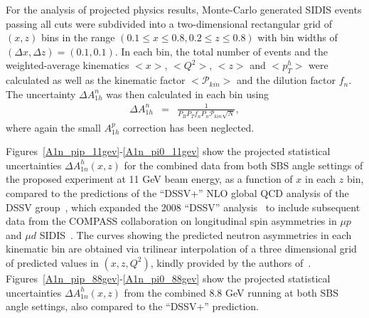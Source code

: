 For the analysis of projected physics results, Monte-Carlo generated SIDIS events passing all cuts were subdivided into a two-dimensional rectangular grid of $(x,z)$ bins in the range $(0.1 \le x \le 0.8, 0.2 \le z \le 0.8)$ with bin widths of $(\Delta x, \Delta z) = (0.1, 0.1)$. In each bin, the total number of events and the weighted-average kinematics $<x>$, $<Q^2>$, $<z>$ and $<p_T^h>$ were calculated as well as the kinematic factor $<\mathcal{P}_{kin}>$ and the dilution factor $f_n$. The uncertainty $\Delta A_{1h}^n$ was then calculated in each bin using 
\begin{eqnarray}
  \Delta A_{1h}^n &=& \frac{1}{P_BP_T f_n P_n \mathcal{P}_{kin}\sqrt{N}}\label{da1nh}, 
\end{eqnarray}
where again the small $A_{1h}^p$ correction has been neglected. 

Figures~\ref{A1n_pip_11gev}-\ref{A1n_pi0_11gev} show the projected statistical uncertainties $\Delta A_{1n}^{h}(x,z)$ for the combined data from both SBS angle settings of the proposed experiment at 11 GeV beam energy, as a function of $x$ in each $z$ bin, compared to the predictions of the ``DSSV+'' NLO global QCD analysis of the DSSV group~\cite{DSSVplus}, which expanded the 2008 ``DSSV'' analysis~\cite{DSSV2008,DSSV2009} to include subsequent data from the COMPASS collaboration on longitudinal spin asymmetries in $\mu p$ and $\mu d$ SIDIS~\cite{COMPASS_d_2009,COMPASS_d_p_2010}. The curves showing the predicted neutron asymmetries in each kinematic bin are obtained via trilinear interpolation of a three dimensional grid of predicted values in $(x,z,Q^2)$, kindly provided by the authors of~\cite{DSSVplus}. Figures~\ref{A1n_pip_88gev}-\ref{A1n_pi0_88gev} show the projected statistical uncertainties $\Delta A_{1n}^{h}(x,z)$ from the combined 8.8 GeV running at both SBS angle settings, also compared to the ``DSSV+'' prediction.

